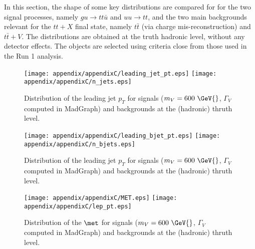 In this section, the shape of some key distributions are compared for for the two signal processes, namely $gu \to tt \bar{u}$ and $uu \to tt$, 
and the two main backgrounds relevant for the $tt+X$ final state, namely $t\bar{t}$ (via charge mis-reconstruction) and $t\bar{t} + V$. The 
distributions are obtained at the truth hadronic level, without any detector effects. The objects are selected using criteria close from those
used in the Run 1 analysis.


\begin{figure}[!h!tpd]
  \centering
  \texttt{[image: appendix/appendixC/leading\_jet\_pt.eps]}
  \texttt{[image: appendix/appendixC/n\_jets.eps]}
  \caption{
      Distribution of the leading jet $p_T$ for signals ($m_V=600~\GeV{}$, $\Gamma_V$ computed in MadGraph) and backgrounds at the (hadronic) thruth level.
  }   
  \label{fig:appB:Vmass}
\end{figure}




\begin{figure}[!h!tpd]
  \centering
  \texttt{[image: appendix/appendixC/leading\_bjet\_pt.eps]}
  \texttt{[image: appendix/appendixC/n\_bjets.eps]}
  \caption{
      Distribution of the leading jet $p_T$ for signals ($m_V=600~\GeV{}$, $\Gamma_V$ computed in MadGraph) and backgrounds at the (hadronic) thruth level.
  }   
  \label{fig:appB:Vmass}
\end{figure}


%


\begin{figure}[!h!tpd]
  \centering
  \texttt{[image: appendix/appendixC/MET.eps]}
  \texttt{[image: appendix/appendixC/lep\_pt.eps]} 
 \caption{
      Distribution of the $\met$ for signals ($m_V=600~\GeV{}$, $\Gamma_V$ computed in MadGraph) and backgrounds at the (hadronic) thruth level.
  }   
  \label{fig:appB:Vmass}
\end{figure}

